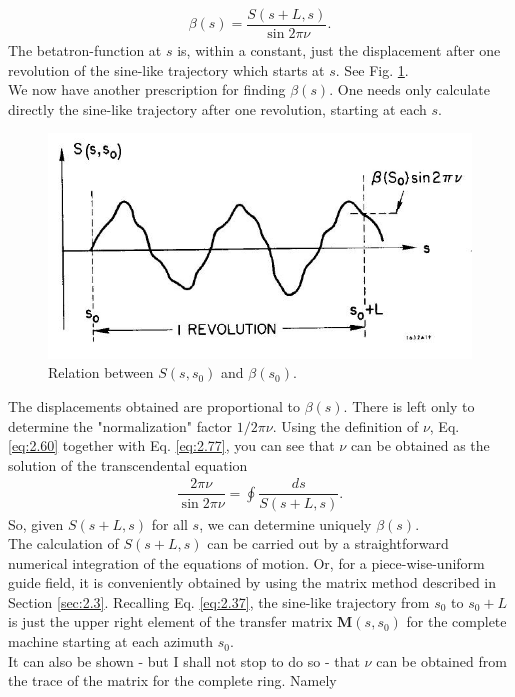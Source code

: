 \begin{align}\label{eq:2.77}
	\beta(s)=\dfrac{S(s+L,s)}{\sin2\pi\nu}.
\end{align}
The betatron-function at $s$ is, within a constant, just the displacement after one revolution
 of the sine-like trajectory which starts at $s$. See Fig. \ref{fig:fig19}.\\
We now have another prescription for finding $\beta(s)$. One needs only calculate directly the sine-like trajectory after one revolution, starting at each $s$.\\
\begin{figure}[!htb]
	\centering
	\includegraphics[width=0.8\linewidth]{./Figuras/fig19.jpeg}
	\caption{Relation between $S(s, s_0)$ and $\beta(s_0)$.}
	\label{fig:fig19}
\end{figure}
The displacements obtained are proportional to $\beta(s)$. There is left only to determine the "normalization" factor $1/2\pi\nu$. Using the definition of $\nu$, Eq. \eqref{eq:2.60} together with Eq. \eqref{eq:2.77}, you can see that $\nu$ can be obtained as the solution of the transcendental equation
\begin{align}
	\dfrac{2\pi\nu}{\sin{2\pi\nu}}=\oint\dfrac{ds}{S(s+L,s)}.
\end{align}
So, given $S(s+L, s)$ for all $s$, we can determine uniquely $\beta(s)$.\\
The calculation of $S(s +L, s)$ can be carried out by a straightforward numerical integration
 of the equations of motion. Or, for a piece-wise-uniform guide field, it is conveniently obtained by using the matrix method described in Section \ref{sec:2.3}. Recalling Eq. \eqref{eq:2.37}, the sine-like trajectory from $s_0$ to $s_0 + L$ is just the upper right element of the transfer matrix $\bm{M}(s, s_0)$ for the complete machine starting at each azimuth $s_0$.\\
It can also be shown - but I shall not stop to do so - that $\nu$ can be obtained from the trace of the matrix for the complete ring. Namely
